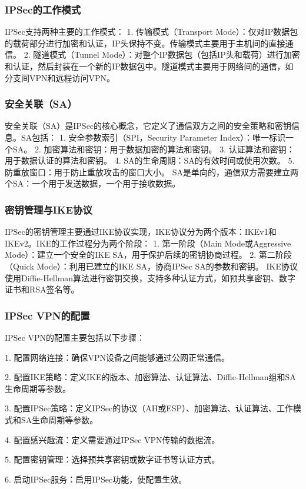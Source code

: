 \documentclass{book}
\begin{document}
\subsubsection{IPSec的工作模式}
IPSec支持两种主要的工作模式：
1. 传输模式（Transport Mode）：仅对IP数据包的载荷部分进行加密和认证，IP头保持不变。传输模式主要用于主机间的直接通信。
2. 隧道模式（Tunnel Mode）：对整个IP数据包（包括IP头和载荷）进行加密和认证，然后封装在一个新的IP数据包中。隧道模式主要用于网络间的通信，如分支间VPN和远程访问VPN。
\subsubsection{安全关联（SA）}
安全关联（SA）是IPSec的核心概念，它定义了通信双方之间的安全策略和密钥信息。SA包括：
1. 安全参数索引（SPI，Security Parameter Index）：唯一标识一个SA。
2. 加密算法和密钥：用于数据加密的算法和密钥。
3. 认证算法和密钥：用于数据认证的算法和密钥。
4. SA的生命周期：SA的有效时间或使用次数。
5. 防重放窗口：用于防止重放攻击的窗口大小。
SA是单向的，通信双方需要建立两个SA：一个用于发送数据，一个用于接收数据。
\subsubsection{密钥管理与IKE协议}
IPSec的密钥管理主要通过IKE协议实现，IKE协议分为两个版本：IKEv1和IKEv2。IKE的工作过程分为两个阶段：
1. 第一阶段（Main Mode或Aggressive Mode）：建立一个安全的IKE SA，用于保护后续的密钥协商过程。
2. 第二阶段（Quick Mode）：利用已建立的IKE SA，协商IPSec SA的参数和密钥。
IKE协议使用Diffie-Hellman算法进行密钥交换，支持多种认证方式，如预共享密钥、数字证书和RSA签名等。

\subsubsection{IPSec VPN的配置}

IPSec VPN的配置主要包括以下步骤：

1. 配置网络连接：确保VPN设备之间能够通过公网正常通信。

2. 配置IKE策略：定义IKE的版本、加密算法、认证算法、Diffie-Hellman组和SA生命周期等参数。

3. 配置IPSec策略：定义IPSec的协议（AH或ESP）、加密算法、认证算法、工作模式和SA生命周期等参数。

4. 配置感兴趣流：定义需要通过IPSec VPN传输的数据流。

5. 配置密钥管理：选择预共享密钥或数字证书等认证方式。

6. 启动IPSec服务：启用IPSec功能，使配置生效。
\end{document}
